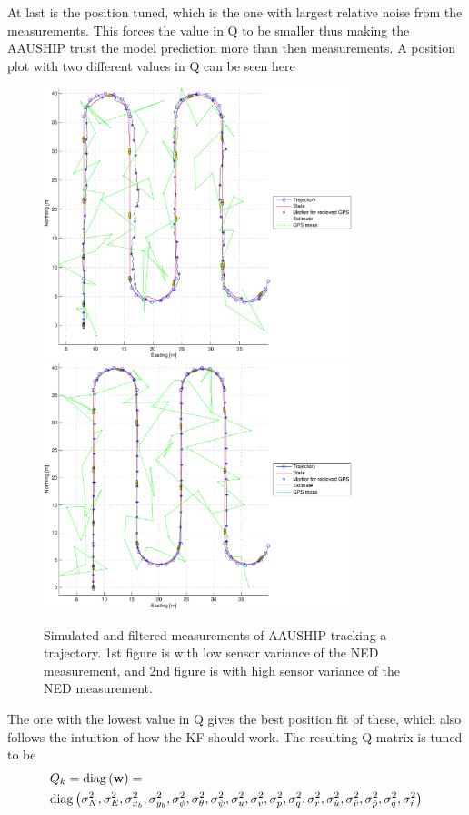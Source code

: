 At last is the position tuned, which is the one with largest relative noise from the measurements. This forces the value in Q to be smaller thus making the AAUSHIP trust the model prediction more than then measurements. A position plot with two different values in Q can be seen here
\begin{figure}
\centering
  \includegraphics[width=0.8\textwidth]{../../code/matlab/q0,001}
  \includegraphics[width=0.8\textwidth]{../../code/matlab/q0,00001}
  \caption{Simulated and filtered measurements of AAUSHIP tracking a trajectory. 1st figure is with low sensor variance of the NED measurement, and 2nd figure is with high sensor variance of the NED measurement.}
  \label{fig:postest0,00001}
\end{figure}
The one with the lowest value in Q gives the best position fit of these, which also follows the intuition of how the \ac{KF} should work. The resulting Q matrix is tuned to be
\begin{align}
&Q_k = \mathrm{diag}\left(\mathbf{w}\right) = \\ \nonumber
&\mathrm{diag}\left(\sigma_{N}^2, \sigma_{E}^2, \sigma_{x_{b}}^2, \sigma_{y_{b}}^2, \sigma_{\phi}^2, \sigma_{\theta}^2, \sigma_{\psi}^2, \sigma_{u}^2, \sigma_{v}^2, \sigma_{p}^2, \sigma_{q}^2, \sigma_{r}^2, \sigma_{\dot u}^2, \sigma_{\dot v}^2, \sigma_{\dot p}^2, \sigma_{\dot q}^2, \sigma_{\dot r}^2\right)
\end{align}

